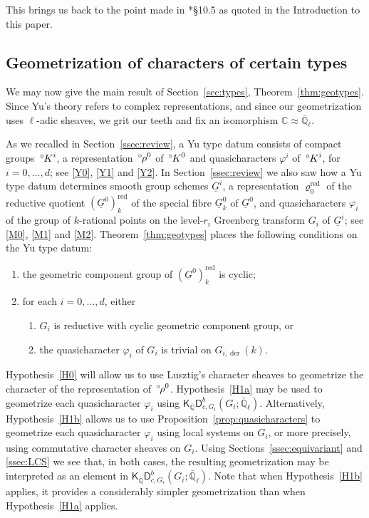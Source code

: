 \documentclass[10pt]{amsart}
\makeatletter
\theoremstyle{plain}
\theoremstyle{definition}
\newcommand{\CC}{{\mathbb{C}}}
\newcommand{\QQ}{{\mathbb{Q}}}
\newcommand{\EE}{\mathbb{\bar Q}_\ell}
\newcommand{\labitem}[2]{
\def\@itemlabel{\textbf{#1}}
\item
\def\@currentlabel{#1}\label{#2}}
\newcommand{\red}{^{\operatorname{red}}}
\newcommand{\oK}{{\,^\circ \hskip-1pt K}}
\newcommand{\orho}{{\,^\circ \hskip-1pt \rho}}
\makeatother
\begin{document}
This brings us back to the point made in \cite{Yu:models}*{\S 10.5} as quoted in the Introduction to this paper.


\subsection{Geometrization of characters of certain types}\label{ssec:geotypes}

We may now give the main result of Section~\ref{sec:types}, Theorem~\ref{thm:geotypes}.
Since Yu's theory refers to complex representations, and since our geometrization uses $\ell$-adic sheaves, we grit our teeth and fix an isomorphism $\CC \approx \EE$.


As we recalled in Section~\ref{ssec:review}, a Yu type datum consists of compact groups $\oK^i$, a representation $\orho^0$ of $\oK^0$ and quasicharacters $\varphi^i$ of $\oK^i$, for $i=0,\ldots, d$; see \ref{Y0}, \ref{Y1} and \ref{Y2}.
In Section~\ref{ssec:review} we also saw how a Yu type datum determines smooth group schemes $\underline{G}^i$, a representation $\varrho_0\red$ of the reductive quotient $(\underline{G}^0)\red_{k}$ of the special fibre $\underline{G}^0_{k}$ of $\underline{G}^0$, and quasicharacters $\varphi_i$ of the group of $k$-rational points on the level-$r_i$ Greenberg transform $G_i$ of $\underline{G}^i$; see \ref{M0}, \ref{M1} and \ref{M2}.
%
Theorem~\ref{thm:geotypes} places the following conditions on the Yu type datum:
\begin{enumerate}
\labitem{H0}{H0} the geometric component group of $(\underline{G}^0)\red_{k}$ is cyclic;
\labitem{H1}{H1} for each $i=0,\ldots, d$, either
\begin{enumerate}
\labitem{H1(a)}{H1a} $G_i$ is reductive with cyclic geometric component group, or
\labitem{H1(b)}{H1b} the quasicharacter $\varphi_i$ of $G_i$ is trivial on  $G_{i,\operatorname{der}}(k)$.
\end{enumerate}
\end{enumerate}
Hypothesis~\ref{H0} will allow us to use Lusztig's character sheaves to geometrize the character of the representation of $\orho^0$.
Hypothesis~\ref{H1a} may be used to geometrize each quasicharacter $\varphi_i$ using $\mathsf{K}_{\bar\QQ}\mathsf{D}^b_{c,G_i}(G_i;\EE)$.
Alternatively, Hypothesis~\ref{H1b} allows us to use Proposition~\ref{prop:quasicharacters} to geometrize each quasicharacter $\varphi_i$ using local systems on $G_i$, or more precisely, using commutative character sheaves on $G_i$.
Using Sections~\ref{ssec:equivariant} and \ref{ssec:LCS} we see that, in both cases, the resulting geometrization may be interpreted as an element in $\mathsf{K}_{\bar\QQ}\mathsf{D}^b_{c,G_i}(G_i;\EE)$.
Note that when Hypothesis~\ref{H1b} applies, it provides a considerably simpler geometrization than when Hypothesis~\ref{H1a} applies.
\end{document}
